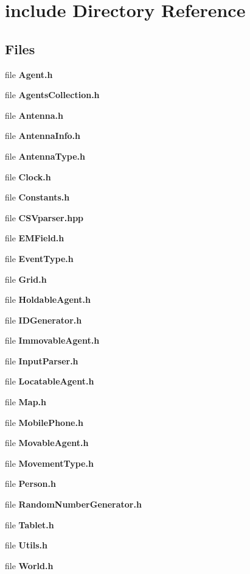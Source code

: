 \section{include Directory Reference}
\label{dir_d44c64559bbebec7f509842c48db8b23}
\subsection*{Files}
\begin{DoxyCompactItemize}
\item 
file \textbf{ Agent.\+h}
\item 
file \textbf{ Agents\+Collection.\+h}
\item 
file \textbf{ Antenna.\+h}
\item 
file \textbf{ Antenna\+Info.\+h}
\item 
file \textbf{ Antenna\+Type.\+h}
\item 
file \textbf{ Clock.\+h}
\item 
file \textbf{ Constants.\+h}
\item 
file \textbf{ C\+S\+Vparser.\+hpp}
\item 
file \textbf{ E\+M\+Field.\+h}
\item 
file \textbf{ Event\+Type.\+h}
\item 
file \textbf{ Grid.\+h}
\item 
file \textbf{ Holdable\+Agent.\+h}
\item 
file \textbf{ I\+D\+Generator.\+h}
\item 
file \textbf{ Immovable\+Agent.\+h}
\item 
file \textbf{ Input\+Parser.\+h}
\item 
file \textbf{ Locatable\+Agent.\+h}
\item 
file \textbf{ Map.\+h}
\item 
file \textbf{ Mobile\+Phone.\+h}
\item 
file \textbf{ Movable\+Agent.\+h}
\item 
file \textbf{ Movement\+Type.\+h}
\item 
file \textbf{ Person.\+h}
\item 
file \textbf{ Random\+Number\+Generator.\+h}
\item 
file \textbf{ Tablet.\+h}
\item 
file \textbf{ Utils.\+h}
\item 
file \textbf{ World.\+h}
\end{DoxyCompactItemize}
